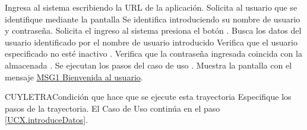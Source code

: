 \begin{UCtrayectoria}
	\UCpaso[\UCactor] Ingresa al sistema escribiendo la URL de la aplicación.
	\UCpaso Solicita al usuario que se identifique mediante la pantalla 
	\UCpaso[\UCactor] \label{UCX.introduceDatos} Se identifica introduciendo su nombre de usuario y contraseña.
	\UCpaso[\UCactor] Solicita el ingreso al sistema presiona el botón .
	\UCpaso Busca los datos del usuario identificado por el nombre de usuario introducido 
	\UCpaso Verifica que el usuario especificado no esté inactivo  .
	\UCpaso Verifica que la contraseña ingresada coincida con la almacenada .
	\UCpaso[] Se ejecutan los pasos del caso de uso .
	\UCpaso Muestra la pantalla  con el mensaje \hyperlink{MSG1}{MSG1 Bienvenida al usuario}.		
\end{UCtrayectoria}


\begin{UCtrayectoriaA}{CUY}{LETRA}{Condición que hace que se ejecute esta trayectoria}
	\UCpaso Especifique los pasos  de la trayectoria.
	\UCpaso[] El Caso de Uso continúa en el paso \ref{UCX.introduceDatos}.
\end{UCtrayectoriaA}


